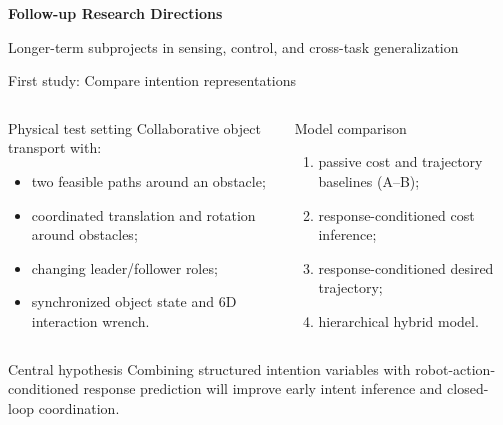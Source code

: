 \documentclass[aspectratio=169,11pt]{beamer}
\begin{document}
\begin{frame}[plain]
\centering
\vfill
{\color{navy}\LARGE\bfseries Follow-up Research Directions}\par
\vspace{0.35cm}
{\color{muted}\large Longer-term subprojects in sensing, control, and cross-task generalization}\par
\vfill
\end{frame}



\begin{frame}{First study: Compare intention representations}
\begin{columns}[T,onlytextwidth]
\begin{block}{Physical test setting}
Collaborative object transport with:
\begin{itemize}
  \item two feasible paths around an obstacle;
  \item coordinated translation and rotation around obstacles;
  \item changing leader/follower roles;
  \item synchronized object state and 6D interaction wrench.
\end{itemize}
\end{block}
\begin{block}{Model comparison}
\begin{enumerate}
  \item passive cost and trajectory baselines (A--B);
  \item response-conditioned cost inference;
  \item response-conditioned desired trajectory;
  \item hierarchical hybrid model.
\end{enumerate}
\end{block}
\end{columns}
\vspace{0.18cm}
\begin{alertblock}{Central hypothesis}
Combining structured intention variables with robot-action-conditioned response prediction will improve early intent inference and closed-loop coordination.
\end{alertblock}
\end{frame}
\end{document}
